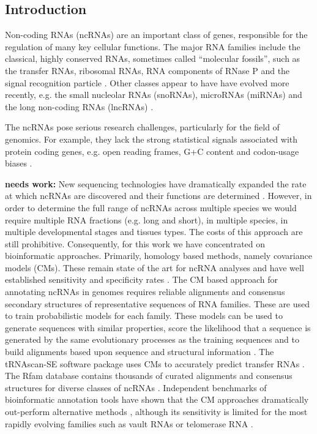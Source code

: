 \documentclass[10pt]{bmc_article}
\newenvironment{bmcformat}{\begin{raggedright}\baselineskip20pt\sloppy\setboolean{publ}{false}}{\end{raggedright}\baselineskip20pt\sloppy}
\begin{document}
\begin{bmcformat}



\section*{Introduction}

Non-coding RNAs (ncRNAs) are an important class of genes, responsible
for the regulation of many key cellular functions. The major RNA
families include the classical, highly conserved RNAs, sometimes
called ``molecular fossils'', such as the transfer RNAs, ribosomal
RNAs, RNA components of RNase P and the signal recognition particle
\cite{Jeffares:1998}. Other classes appear to have have evolved more
recently, e.g. the small nucleolar RNAs (snoRNAs), microRNAs (miRNAs)
and the long non-coding RNAs (lncRNAs) \cite{Hoeppner:2012}.


The ncRNAs pose serious research challenges, particularly for the
field of genomics. For example, they lack the strong statistical
signals associated with protein coding genes, e.g. open reading
frames, G+C content and codon-usage biases \cite{Rivas:2000}. 

{\bf needs work:} New sequencing technologies have dramatically
expanded the rate at which ncRNAs are discovered and their functions
are determined \cite{}. However, in order to determine the full range
of ncRNAs across multiple species we would require multiple RNA
fractions (e.g. long and short), in multiple species, in multiple
developmental stages and tissues types. The costs of this approach are
still prohibitive. Consequently, for this work we have concentrated on
bioinformatic approaches. Primarily, homology based methods, namely
covariance models (CMs). These remain state of the art for ncRNA
analyses \cite{Sakakibara:1994,Eddy:1994,Nawrocki:2009} and have well
established sensitivity and specificity rates \cite{Freyhult:2007}.
The CM based approach for annotating ncRNAs in genomes requires
reliable alignments and consensus secondary structures of
representative sequences of RNA families. These are used to train
probabilistic models for each family. These models can be used to
generate sequences with similar properties, score the likelihood that
a sequence is generated by the same evolutionary processes as the
training sequences and to build alignments based upon sequence and
structural information \cite{Sakakibara:1994,Eddy:1994,Nawrocki:2009}.
The tRNAscan-SE software package uses CMs to accurately predict
transfer RNAs \cite{Lowe:1997,Chan:2009}.  The Rfam database contains
thousands of curated alignments and consensus structures for diverse
classes of ncRNAs
\cite{Griffiths-Jones:2003,Griffiths-Jones:2005,Gardner:2009,Gardner:2011a,Burge:2013}.
Independent benchmarks of bioinformatic annotation tools have shown
that the CM approaches dramatically out-perform alternative methods
\cite{Freyhult:2007}, although its sensitivity is limited for the most
rapidly evolving families such as vault RNAs or telomerase RNA
\cite{Menzel:09a}.



\end{bmcformat}
\end{document}
